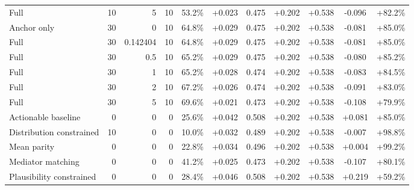 \begin{table}[htbp]
\begin{tabular}{lrrrccccccc}
Full & 10 & 5 & 10 & 53.2\% & +0.023 & 0.475 & +0.202 & +0.538 & -0.096 & +82.2\% \\
Anchor only & 30 & 0 & 10 & 64.8\% & +0.029 & 0.475 & +0.202 & +0.538 & -0.081 & +85.0\% \\
Full & 30 & 0.142404 & 10 & 64.8\% & +0.029 & 0.475 & +0.202 & +0.538 & -0.081 & +85.0\% \\
Full & 30 & 0.5 & 10 & 65.2\% & +0.029 & 0.475 & +0.202 & +0.538 & -0.080 & +85.2\% \\
Full & 30 & 1 & 10 & 65.2\% & +0.028 & 0.474 & +0.202 & +0.538 & -0.083 & +84.5\% \\
Full & 30 & 2 & 10 & 67.2\% & +0.026 & 0.474 & +0.202 & +0.538 & -0.091 & +83.0\% \\
Full & 30 & 5 & 10 & 69.6\% & +0.021 & 0.473 & +0.202 & +0.538 & -0.108 & +79.9\% \\
Actionable baseline & 0 & 0 & 0 & 25.6\% & +0.042 & 0.508 & +0.202 & +0.538 & +0.081 & +85.0\% \\
Distribution constrained & 10 & 0 & 0 & 10.0\% & +0.032 & 0.489 & +0.202 & +0.538 & -0.007 & +98.8\% \\
Mean parity & 0 & 0 & 0 & 22.8\% & +0.034 & 0.496 & +0.202 & +0.538 & +0.004 & +99.2\% \\
Mediator matching & 0 & 0 & 0 & 41.2\% & +0.025 & 0.473 & +0.202 & +0.538 & -0.107 & +80.1\% \\
Plausibility constrained & 0 & 0 & 0 & 28.4\% & +0.046 & 0.508 & +0.202 & +0.538 & +0.219 & +59.2\% \\
\bottomrule
\end{tabular}
\end{table}